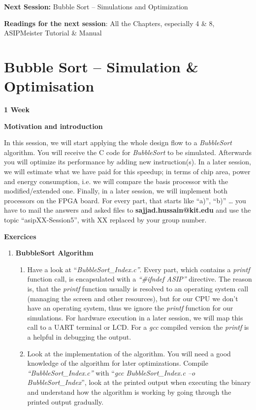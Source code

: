 \documentclass[
]{article}
\begin{document}

\textbf{Next Session:} Bubble Sort -- Simulations and Optimization

\textbf{Readings for the next session}: All the Chapters, especially 4
\& 8, ASIPMeister Tutorial \& Manual

\hypertarget{bubble-sort-simulation-optimisation}{%
\section{\texorpdfstring{\textbf{Bubble Sort --} Simulation \textbf{\&
Optimisation}}{Bubble Sort -- Simulation \& Optimisation}}\label{bubble-sort-simulation-optimisation}}

\textbf{{1 Week}}

\textbf{Motivation and introduction}

In this session, we will start applying the whole design flow to a
\emph{BubbleSort} algorithm. You will receive the C code for
\emph{BubbleSort} to be simulated. Afterwards you will optimize its
performance by adding new instruction(s). In a later session, we will
estimate what we have paid for this speedup; in terms of chip area,
power and energy consumption, i.e. we will compare the basis processor
with the modified/extended one. Finally, in a later session, we will
implement both processors on the FPGA board. For every part, that starts
like ``a)'', ``b)'' \ldots{} you have to mail the answers and asked
files to \textbf{sajjad.hussain@kit.edu} and use the topic
``asipXX-Session5'', with XX replaced by your group number.

\textbf{Exercices}

\begin{enumerate}
\def\labelenumi{\arabic{enumi}.}
\item
  \textbf{BubbleSort Algorithm}

  \begin{enumerate}
  \def\labelenumii{\arabic{enumii}.}
  \item
    Have a look at ``\emph{BubbleSort\_Index.c''}. Every part, which
    contains a \emph{printf} function call, is encapsulated with a
    \emph{``\#ifndef ASIP''} directive. The reason is, that the
    \emph{printf} function usually is resolved to an operating system
    call (managing the screen and other resources), but for our CPU we
    don't have an operating system, thus we ignore the \emph{printf}
    function for our simulations. For hardware execution in a later
    session, we will map this call to a UART terminal or LCD. For a
    \emph{gcc} compiled version the \emph{printf} is a helpful in
    debugging the output.
  \item
    Look at the implementation of the algorithm. You will need a good
    knowledge of the algorithm for later optimizations. Compile
    \emph{``BubbleSort\_Index.c''} with ``\emph{gcc BubbleSort\_Index.c
    --o BubbleSort\_Index}'', look at the printed output when executing
    the binary and understand how the algorithm is working by going
    through the printed output gradually.
  \end{enumerate}
\end{enumerate}
\end{document}

